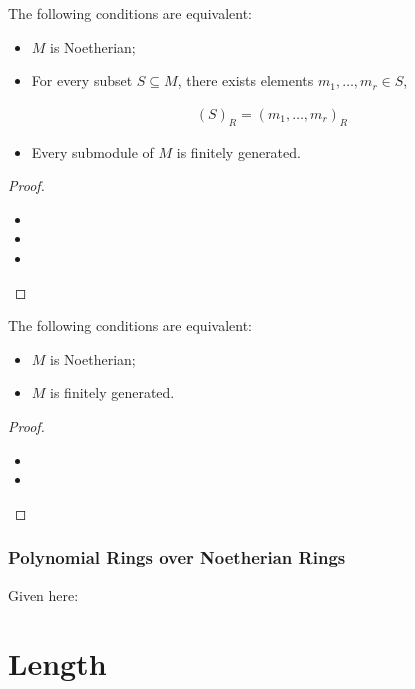 \documentclass[Total.tex]{subfiles}
\begin{document}
				\begin{proposition}
					The following conditions are equivalent:
					
					\begin{itemize}
						\item $M$ is Noetherian;
						\item For every subset $S\subseteq M$, there exists elements $m_1,\dots,m_r\in S$,
						
						\begin{gather*}
							(S)_R=(m_1,\dots,m_r)_R
						\end{gather*}
						\item Every submodule of $M$ is finitely generated.
					\end{itemize}
				\end{proposition}
				
				\begin{proof}
					\begin{itemize}
						\item 
						\item 
						\item 
					\end{itemize}
				\end{proof}
				
				\begin{proposition}
					The following conditions are equivalent:
					
					\begin{itemize}
						\item $M$ is Noetherian;
						\item $M$ is finitely generated.
					\end{itemize}
				\end{proposition}
				
				\begin{proof}
					\begin{itemize}
						\item 
						\item 
					\end{itemize}
				\end{proof}
				
				\subsubsection{Polynomial Rings over Noetherian Rings}
				
				Given here:
				
		
		\section{Length}
		
\end{document}
